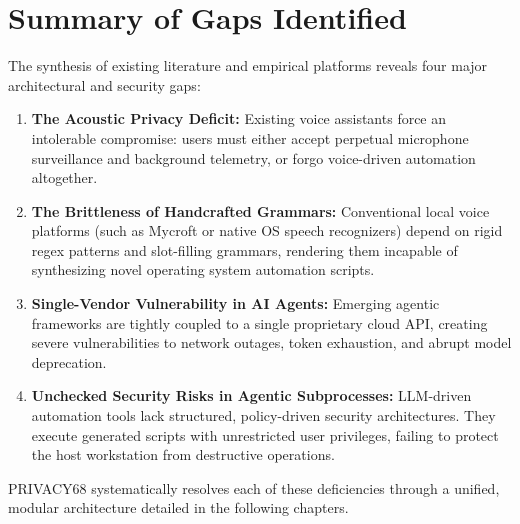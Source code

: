 \section{Summary of Gaps Identified}
The synthesis of existing literature and empirical platforms reveals four major architectural and security gaps:
\begin{enumerate}
    \item \textbf{The Acoustic Privacy Deficit:} Existing voice assistants force an intolerable compromise: users must either accept perpetual microphone surveillance and background telemetry, or forgo voice-driven automation altogether.
    \item \textbf{The Brittleness of Handcrafted Grammars:} Conventional local voice platforms (such as Mycroft or native OS speech recognizers) depend on rigid regex patterns and slot-filling grammars, rendering them incapable of synthesizing novel operating system automation scripts.
    \item \textbf{Single-Vendor Vulnerability in AI Agents:} Emerging agentic frameworks are tightly coupled to a single proprietary cloud API, creating severe vulnerabilities to network outages, token exhaustion, and abrupt model deprecation.
    \item \textbf{Unchecked Security Risks in Agentic Subprocesses:} LLM-driven automation tools lack structured, policy-driven security architectures. They execute generated scripts with unrestricted user privileges, failing to protect the host workstation from destructive operations.
\end{enumerate}

PRIVACY68 systematically resolves each of these deficiencies through a unified, modular architecture detailed in the following chapters.
